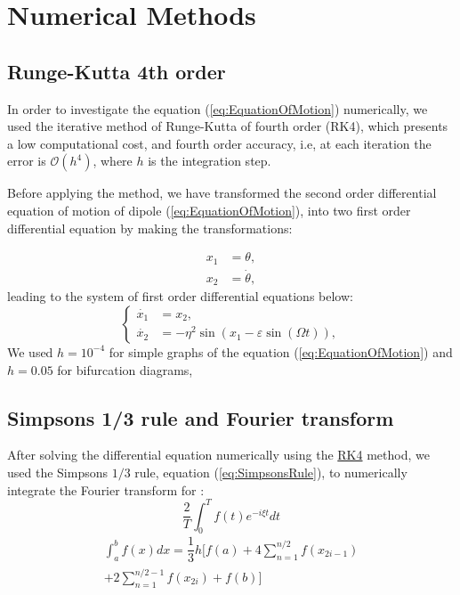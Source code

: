 \section{Numerical Methods}

\subsection{Runge-Kutta 4th order}
\label{sec:RK4}
In order to investigate the equation (\ref{eq:EquationOfMotion}) numerically, we used the iterative method of Runge-Kutta of fourth order (RK4), which presents a low computational cost, and fourth order accuracy, i.e, at each iteration the error is $\mathcal{O}(h^4)$, where $h$ is the integration step.

Before applying the method, we have transformed the second order differential equation of motion of dipole (\ref{eq:EquationOfMotion}), into two first order differential equation by making the transformations:

\begin{equation}
    \begin{aligned}
        x_1 &= \theta,\\
        x_2 &= \dot{\theta}, 
    \end{aligned}
\end{equation}
leading to the system of first order differential equations below:
\begin{equation}
    \begin{cases}
        \dot{x_1} &= x_2,\\
        \dot{x_2} &= -\eta^2 \sin(x_1 - \varepsilon \sin(\Omega t)),
    \end{cases}
\end{equation}
We used $h=10^{-4}$ for simple graphs of the equation (\ref{eq:EquationOfMotion}) and $h = 0.05$ for bifurcation diagrams,
\subsection{Simpson\textquotesingle s 1/3 rule and Fourier transform}
After solving the differential equation numerically using the \hyperref[sec:RK4]{RK4} method, we used the Simpson\textquotesingle s $1/3$ rule, equation (\ref{eq:SimpsonsRule}), to numerically integrate the Fourier transform for : 
\begin{equation}
    \dfrac{2}{T}\int_{0}^{T} f(t) e^{- i \xi t}dt
\end{equation}
    \begin{multline}
        \int_{a}^{b} f(x) dx = \dfrac{1}{3} h\bigg[ f(a) + 
         4\sum^{n/2}_{n=1}f(x_{2i-1}) \\
         + 2 \sum^{n/2 - 1}_{n=1}f(x_{2i})+f(b) \bigg]        
    \label{eq:SimpsonsRule}
\end{multline}
